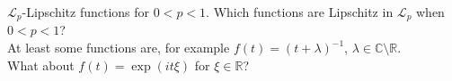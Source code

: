 \documentclass{beamer}
\numberwithin{equation}{section}
\theoremstyle{plain}
\theoremstyle{plain}
\theoremstyle{definition}
\theoremstyle{plain}
\theoremstyle{plain}
\theoremstyle{definition}
\newcommand{\Rl}{\mathbb{R}}
\newcommand{\Cplx}{\mathbb{C}}
\newcommand{\Lc}{\mathcal{L}}
\newcommand{\mf}{\mathfrak{m}}
\begin{document}
\begin{frame}{$\Lc_p$-Lipschitz functions for $0 < p < 1.$}
    Which functions are Lipschitz in $\Lc_p$ when $0 < p < 1$? \\
    \pause
    At least some functions are, for example $f(t) = (t+\lambda)^{-1}$, $\lambda \in \Cplx\setminus \Rl.$\\
    \pause
    What about $f(t) = \exp(it\xi)$ for $\xi\in \Rl$?
\end{frame}

%
%
%
\end{document}
